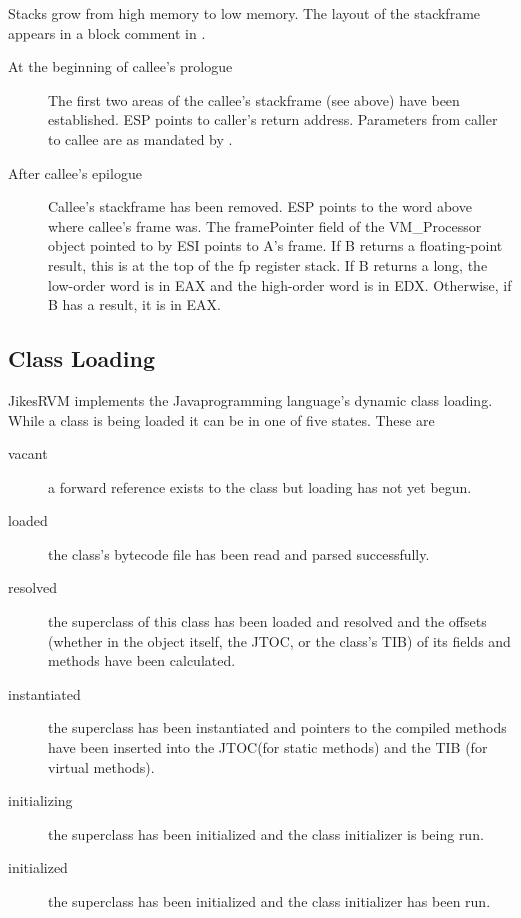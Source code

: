 
Stacks grow from high memory to low memory.
The layout of the stackframe appears in a block comment in
{\LintelStackframeLayoutURL}.


\begin{description}
\item[At the beginning of callee's prologue]
The first two areas of the callee's stackframe (see above) have been
     established.  ESP points to caller's return address.
     Parameters from caller to callee are as mandated by 
{\LintelRegisterConstantsURL}.
\item[After callee's epilogue]
     Callee's stackframe has been removed.  ESP points to the word above where
     callee's frame was.  The framePointer field
     of the VM\_Processor object pointed to by ESI points to A's
     frame.  If B returns a floating-point result, this is at
     the top of the fp register stack.  If B returns a long, the
     low-order word is in EAX and the high-order word is in EDX.
     Otherwise, if B has a result, it is in EAX.

\end{description}

\JavaTMFooter

\AIXPPCTMFooter

\subsection{Class Loading} \label{sssec:classLoading}

Jikes\trademark RVM implements the Java\trademark programming
language's dynamic class 
loading. While a class is being loaded it 
can be in one of five states. These are
\begin{description}
\item[vacant] a forward reference exists to the class but loading has not yet 
begun.
\item[loaded] the class's bytecode file has been read and parsed successfully.
\item[resolved] the superclass of this class has been loaded and resolved and
the offsets (whether in the object itself, the JTOC, or the class's TIB) of its 
fields and methods have been calculated.
\item[instantiated] the superclass has been instantiated and pointers to the
compiled methods have been inserted into the JTOC(for static methods) and the
TIB (for virtual methods).
\item[initializing] the superclass has been initialized and the class
initializer is being run.
\item[initialized] the superclass has been initialized and the class
initializer has been run.
\end{description}

